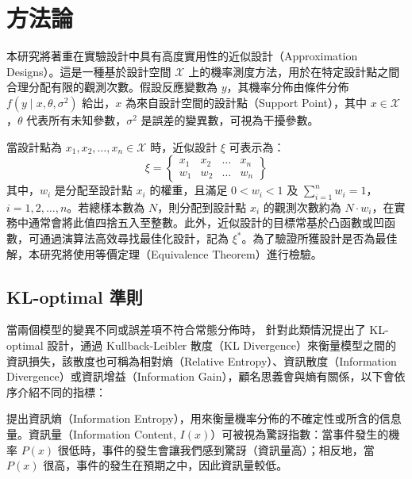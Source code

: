 \chapter{方法論 \label{CH: method}}

\hspace*{8mm} 本研究將著重在實驗設計中具有高度實用性的近似設計（Approximation Designs）。這是一種基於設計空間 $\mathcal{X}$ 上的機率測度方法，用於在特定設計點之間合理分配有限的觀測次數。假設反應變數為 $y$，其機率分佈由條件分佈 $f(y \mid x, \theta, \sigma^2)$ 給出，$x$ 為來自設計空間的設計點（Support Point），其中 $x \in \mathcal{X}$ ，$\theta$ 代表所有未知參數，$\sigma^2$ 是誤差的變異數，可視為干擾參數。

\hspace*{8mm} 當設計點為 $x_1, x_2, \dots, x_n \in \mathcal{X}$ 時，近似設計 $\xi$ 可表示為：
$$
\xi = \left\{\begin{array}{cccc}
x_1 & x_2 & \dots & x_n \\
w_1 & w_2 & \dots & w_n
\end{array}\right\}
$$
\hspace*{8mm} 其中，$w_i$ 是分配至設計點 $x_i$ 的權重，且滿足 $0 < w_i < 1$ 及 $\sum_{i=1}^n w_i = 1$，$i = 1, 2, \dots, n$。若總樣本數為 $N$，則分配到設計點 $x_i$ 的觀測次數約為 $N \cdot w_i$，在實務中通常會將此值四捨五入至整數。此外，近似設計的目標常基於凸函數或凹函數，可通過演算法高效尋找最佳化設計，記為 $\xi^*$。為了驗證所獲設計是否為最佳解，本研究將使用等價定理（Equivalence Theorem）進行檢驗。

\section{KL-optimal 準則}

\hspace*{8mm} 當兩個模型的變異不同或誤差項不符合常態分佈時，\cite{lopez2007optimal} 針對此類情況提出了 KL-optimal 設計，通過 Kullback-Leibler 散度（KL Divergence）來衡量模型之間的資訊損失，該散度也可稱為相對熵（Relative Entropy）、資訊散度（Information Divergence）或資訊增益（Information Gain），顧名思義會與熵有關係，以下會依序介紹不同的指標：

\hspace*{8mm} \cite{shannon1948mathematical} 提出資訊熵（Information Entropy），用來衡量機率分佈的不確定性或所含的信息量。資訊量（Information Content, $I(x)$）可被視為驚訝指數：當事件發生的機率 $P(x)$ 很低時，事件的發生會讓我們感到驚訝（資訊量高）；相反地，當 $P(x)$ 很高，事件的發生在預期之中，因此資訊量較低。

